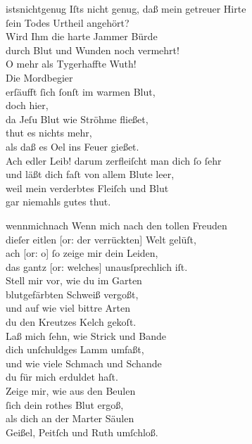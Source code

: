 \documentclass[tocstyle=ref-genre]{ees}
\begin{document}
{\begin{movement}{istsnichtgenug}
  Iſts nicht genug, daß mein getreuer Hirte\\
  ſein Todes Urtheil angehört?\\
  Wird Ihm die harte Jammer Bürde\\
  durch Blut und Wunden noch vermehrt!\\
  O mehr als Tygerhaffte Wuth!\\
  Die Mordbegier\\
  erſäufft ſich ſonſt im warmen Blut,\\
  doch hier,\\
  da Jeſu Blut wie Ströhme fließet,\\
  thut es nichts mehr,\\
  als daß es Oel ins Feuer gießet.\\
  Ach edler Leib! darum zerfleiſcht man dich ſo ſehr\\
  und läßt dich faſt von allem Blute leer,\\
  weil mein verderbtes Fleiſch und Blut\\
  gar niemahls gutes thut.
\end{movement}

\begin{movement}{wennmichnach}
  Wenn mich nach den tollen Freuden\\
  dieſer eitlen [or: der verrückten] Welt gelüſt,\\
  ach [or: o] ſo zeige mir dein Leiden,\\
  das gantz [or: welches] unausſprechlich iſt.\\
  Stell mir vor, wie du im Garten\\
  blutgefärbten Schweiß vergoßt,\\
  und auf wie viel bittre Arten\\
  du den Kreutzes Kelch gekoſt.\\
  Laß mich ſehn, wie Strick und Bande\\
  dich unſchuldges Lamm umfaßt,\\
  und wie viele Schmach und Schande\\
  du für mich erduldet haſt.\\
  Zeige mir, wie aus den Beulen\\
  ſich dein rothes Blut ergoß,\\
  als dich an der Marter Säulen\\
  Geißel, Peitſch und Ruth umſchloß.
\end{movement}

}
\end{document}
